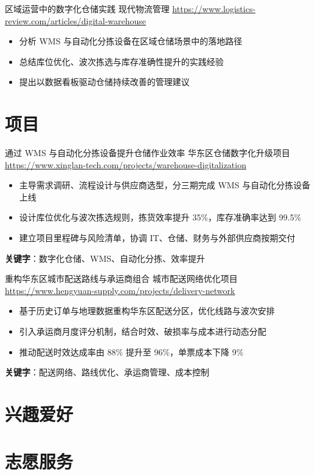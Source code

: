 \documentclass[a4paper, serif, 10pt]{moderncv}
\begin{document}
        {区域运营中的数字化仓储实践}
        {现代物流管理}
        {\url{https://www.logistics-review.com/articles/digital-warehouse}}
        {}
        {\begin{itemize}
\item 分析 WMS 与自动化分拣设备在区域仓储场景中的落地路径
\item 总结库位优化、波次拣选与库存准确性提升的实践经验
\item 提出以数据看板驱动仓储持续改善的管理建议
\end{itemize}}
\section{项目}

        {通过 WMS 与自动化分拣设备提升仓储作业效率}
        {华东区仓储数字化升级项目}
        {\url{https://www.xinglan-tech.com/projects/warehouse-digitalization}}
        {}
        {\begin{itemize}
\item 主导需求调研、流程设计与供应商选型，分三期完成 WMS 与自动化分拣设备上线
\item 设计库位优化与波次拣选规则，拣货效率提升 35\%，库存准确率达到 99.5\%
\item 建立项目里程碑与风险清单，协调 IT、仓储、财务与外部供应商按期交付
\end{itemize}
\textbf{关键字}：数字化仓储、WMS、自动化分拣、效率提升}

        {重构华东区城市配送路线与承运商组合}
        {城市配送网络优化项目}
        {\url{https://www.hengyuan-supply.com/projects/delivery-network}}
        {}
        {\begin{itemize}
\item 基于历史订单与地理数据重构华东区配送分区，优化线路与波次安排
\item 引入承运商月度评分机制，结合时效、破损率与成本进行动态分配
\item 推动配送时效达成率由 88\% 提升至 96\%，单票成本下降 9\%
\end{itemize}
\textbf{关键字}：配送网络、路线优化、承运商管理、成本控制}
\section{兴趣爱好}

\section{志愿服务}
\end{document}
